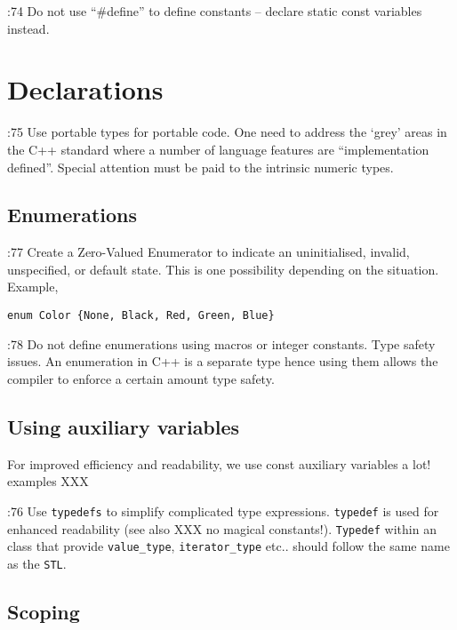 \documentclass{book}
\newcommand{\name}[1]{\texttt{#1}}
\begin{document}
\cite{OKL_MisfeldtBumgardnerGray2004CppStyle}:74 Do not use ``{\#}define'' to define constants -- declare static const variables instead. 




\chapter{Declarations}
\label{cha:Declarations}

\cite{OKL_MisfeldtBumgardnerGray2004CppStyle}:75 Use portable types for portable code. One need to address the `grey' areas in the C++ standard where a number of language features are ``implementation defined''. Special attention must be paid to the intrinsic numeric types.

\section{Enumerations}
\label{sec:enum}

\cite{OKL_MisfeldtBumgardnerGray2004CppStyle}:77 Create a Zero-Valued Enumerator to indicate an uninitialised, invalid, unspecified, or default state. This is one possibility depending on the situation. Example, 

\begin{verbatim}
enum Color {None, Black, Red, Green, Blue}
\end{verbatim}

\cite{OKL_MisfeldtBumgardnerGray2004CppStyle}:78 Do not define enumerations using macros or integer constants. Type safety issues. An enumeration in C++ is a separate type hence using them allows the compiler to enforce a certain amount type safety. 
 
\section{Using auxiliary variables}
\label{sec:auxvar}

For improved efficiency and readability, we use const auxiliary variables a lot! examples XXX

\cite{OKL_MisfeldtBumgardnerGray2004CppStyle}:76 Use \name{typedefs} to simplify complicated type expressions. \name{typedef} is used for enhanced readability (see also XXX no magical constants!). \name{Typedef} within an class that provide \name{value\_type}, \name{iterator\_type} etc.. should follow the same name as the \name{STL}.



\section{Scoping}
\label{sec:Scoping}
\end{document}
